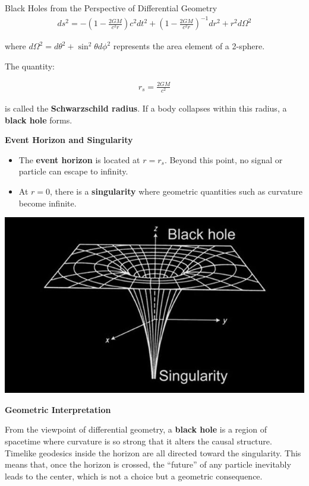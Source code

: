 \documentclass[final]{beamer}
\newlength{\colwidth}
\begin{document}
\begin{frame}[t]
\begin{columns}[t]
\begin{column}{\colwidth}
\begin{block}{Black Holes from the Perspective of Differential Geometry}
      \begin{align*}
      ds^2 = -\left(1 - \frac{2GM}{c^2 r} \right)c^2 dt^2 + \left(1 - \frac{2GM}{c^2 r} \right)^{-1} dr^2 + r^2 d\Omega^2
      \end{align*}
      
      where $d\Omega^2 = d\theta^2 + \sin^2\theta d\phi^2$ represents the area element of a 2-sphere.
      
      The quantity:
      
      \begin{align*}
      r_s = \frac{2GM}{c^2}
      \end{align*}
      
      is called the \textbf{Schwarzschild radius}. If a body collapses within this radius, a \textbf{black hole} forms.
      
      \textbf{\large Event Horizon and Singularity}
      
      \begin{itemize}
        \item The \textbf{event horizon} is located at \(r = r_s\). Beyond this point, no signal or particle can escape to infinity.
        \item At \(r = 0\), there is a \textbf{singularity} where geometric quantities such as curvature become infinite.
      \end{itemize}
      \begin{center}
        \includegraphics[scale=0.8]{negroagujero.jpeg}
      \end{center}
            
      \textbf{\large Geometric Interpretation}
      
      From the viewpoint of differential geometry, a \textbf{black hole} is a region of spacetime where curvature is so strong that it alters the causal structure. Timelike geodesics inside the horizon are all directed toward the singularity. This means that, once the horizon is crossed, the “future” of any particle inevitably leads to the center, which is not a choice but a geometric consequence.
      

\end{block}
\end{column}
\end{columns}
\end{frame}
\end{document}

